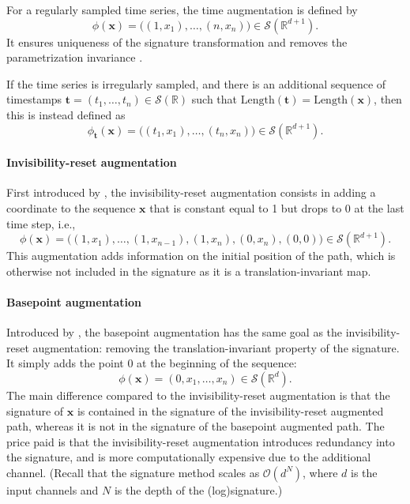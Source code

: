 \documentclass{article}
\theoremstyle{definition}
\theoremstyle{remark}
\newcommand{\reals}{\mathbb{R}}
\newcommand{\bigO}{\mathcal{O}}
\newcommand{\tseries}[1]{\mathcal{S}(#1)}
\newcommand{\len}[1]{\mathrm{Length}(#1)}
\begin{document}
	For a regularly sampled time series, the time augmentation is defined by
	\begin{equation*}
	\phi(\mathbf{x})= \big((1,x_1),\dots,(n,x_n) \big) \in \tseries{\reals^{d+1}}.
	\end{equation*}
	It ensures uniqueness of the signature transformation and removes the parametrization invariance \citep{levin2013learning}.
	
	If the time series is irregularly sampled, and there is an additional sequence of timestamps $\mathbf{t} = (t_1, \ldots, t_n) \in \tseries{\reals}$ such that $\len{\mathbf{t}} = \len{\mathbf{x}}$, then this is instead defined as
	\begin{equation*}
	\phi_{\mathbf{t}}(\mathbf{x})= \big((t_1,x_1),\dots,(t_n,x_n) \big) \in \tseries{\reals^{d+1}}.
	\end{equation*}

	\paragraph{Invisibility-reset augmentation}

	First introduced by \citet{yang2017leveraging}, the invisibility-reset augmentation consists in adding a coordinate to the sequence $\mathbf{x}$ that is constant equal to 1 but drops to 0 at the last time step, i.e.,
	\begin{equation*}
	\phi(\mathbf{x})= \big((1,x_1),\dots,(1,x_{n-1}) ,(1,x_n),(0,x_n),(0,0) \big) \in \tseries{\reals^{d+1}}.
	\end{equation*}
	This augmentation adds information on the initial position of the path, which is otherwise not included in the signature as it is a translation-invariant map.

	\paragraph{Basepoint augmentation}
	Introduced by \citet{signatory}, the basepoint augmentation has the same goal as the invisibility-reset augmentation: removing the translation-invariant property of the signature. It simply adds the point 0 at the beginning of the sequence:
	\begin{equation*}
	\phi(\mathbf{x})= (0,x_1,\dots,x_n) \in \tseries{\reals^{d}}.
	\end{equation*}
	The main difference compared to the invisibility-reset augmentation is that the signature of $\mathbf{x}$ is contained in the signature of the invisibility-reset augmented path, whereas it is not in the signature of the basepoint augmented path. The price paid is that the invisibility-reset augmentation introduces redundancy into the signature, and is more computationally expensive due to the additional channel. (Recall that the signature method scales as $\bigO(d^N)$, where $d$ is the input channels and $N$ is the depth of the (log)signature.)
\end{document}
